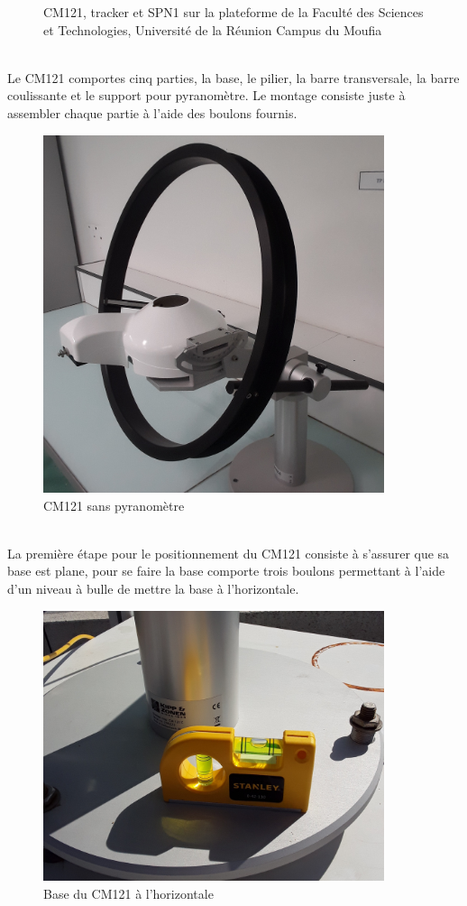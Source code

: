 \documentclass[12pt,a4paper]{article}
\begin{document}
\begin{flushleft}
\begin{figure}[H]
\begin{minipage}[c]{.3\linewidth}
    \end{minipage}
    \caption{CM121, tracker et SPN1 sur la plateforme de la Faculté des Sciences et Technologies, Université de la Réunion Campus du Moufia}
\end{figure}
~\\
Le CM121 comportes cinq parties, la base, le pilier, la barre transversale, la barre coulissante et le support pour pyranomètre. Le montage consiste juste à assembler chaque partie à l'aide des boulons fournis.

\begin{figure}[H]
\centering
\includegraphics[width=10cm]{image/montage/1.jpg} 
\caption{CM121 sans pyranomètre}
\end{figure}

~\\
La première étape pour le positionnement du CM121 consiste à s'assurer que sa base est plane, pour se faire la base comporte trois boulons permettant à l'aide d'un niveau à bulle de mettre la base à l'horizontale. 

\begin{figure}[H]
\centering
\includegraphics[width=10cm]{image/montage/2.jpg} 
\caption{Base du CM121 à l'horizontale}
\end{figure}


\end{flushleft}
\end{document}
